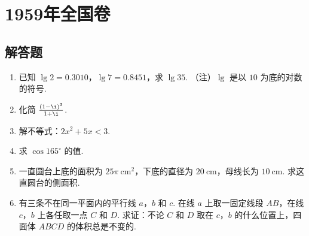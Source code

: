 \documentclass[UTF8,a4paper,oneside,11pt]{ctexbook}
\begin{document}
\mainmatter

\chapter{1959年全国卷}

\section{解答题}

\begin{problem}
\begin{enumerate}
\item 已知 \(\lg 2=0.3010\)，\(\lg 7=0.8451\)，求 \(\lg 35\).
（注）\(\lg\) 是以 \(10\) 为底的对数的符号.

\item 化简 \(\frac{\left( 1-\i \right)^3}{1+\i}\).

\item 解不等式：\(2x^2+5x<3\).

\item 求 \(\cos 165^\circ\) 的值.

\item 一直圆台上底的面积为 \(25\pi \mathrm{~cm}^2\)，下底的直径为 \(20 \mathrm{~cm}\)，母线长为 \(10 \mathrm{~cm}\). 求这直圆台的侧面积.

\item 有三条不在同一平面内的平行线 \(a\)，\(b\) 和 \(c\). 在线 \(a\) 上取一固定线段 \(AB\)，在线 \(c\)，\(b\) 上各任取一点 \(C\) 和 \(D\). 求证：不论 \(C\) 和 \(D\) 取在 \(c\)，\(b\) 的什么位置上，四面体 \(ABCD\) 的体积总是不变的.

\end{enumerate}
\end{problem}
\end{document}
